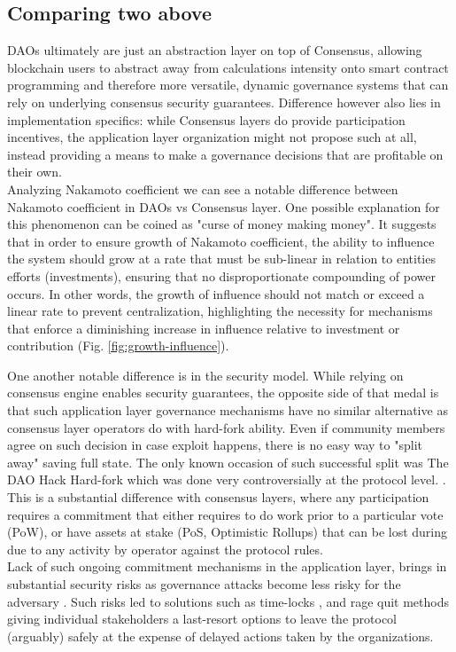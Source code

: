 \documentclass{article}
\begin{document}
\begin{CJK}{UTF8}{gbsn}
\begin{multicols}{2}
        \subsection{Comparing two above}
        DAOs ultimately are just an abstraction layer on top of Consensus, allowing blockchain users to abstract away from calculations intensity onto smart contract programming and therefore more versatile, dynamic governance systems that can rely on underlying consensus security guarantees. Difference however also lies in implementation specifics: while Consensus layers do provide participation incentives, the application layer organization might not propose such at all, instead providing a means to make a governance decisions that are profitable on their own. \\ Analyzing  Nakamoto coefficient we can see a notable difference between Nakamoto coefficient in DAOs vs Consensus layer. One possible explanation for this phenomenon can be coined as "curse of money making money". It suggests that in order to ensure growth of Nakamoto coefficient, the ability to influence the system should grow at a rate that must be sub-linear in relation to entities efforts (investments), ensuring that no disproportionate compounding of power occurs. In other words, the growth of influence should not match or exceed a linear rate to prevent centralization, highlighting the necessity for mechanisms that enforce a diminishing increase in influence relative to investment or contribution (Fig. \ref*{fig:growth-influence}).

        One another notable difference is in the security model. While relying on consensus engine enables security guarantees, the opposite side of that medal is that such application layer governance mechanisms have no similar alternative as consensus layer operators do with hard-fork ability. Even if community members agree on such decision in case exploit happens, there is no easy way to "split away" saving full state. The only known occasion of such successful split was The DAO Hack Hard-fork which was done very controversially at the protocol level.  \cite{Liu2021}.
        This is a substantial difference with consensus layers, where any participation requires a commitment that either requires to do work prior to a particular vote (PoW), or have assets at stake (PoS, Optimistic Rollups) that can be lost during due to any activity by operator against the protocol rules.\\
        Lack of such ongoing commitment mechanisms in the application layer, brings in substantial security risks as governance attacks become less risky for the adversary \cite{AragonBlog}\cite{rhizoo2023}. Such risks led to solutions such as time-locks \cite{Jack2021}, and rage quit \cite{Ameen2019} methods giving individual stakeholders a last-resort options to leave the protocol (arguably) safely at the expense of delayed actions taken by the organizations.


\end{multicols}
\end{CJK}
\end{document}
